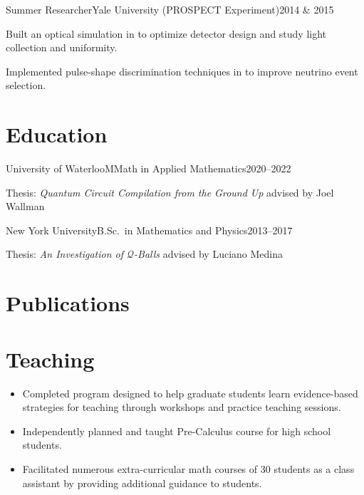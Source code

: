 \documentclass{cultvoucher}
\begin{document}
\begin{entry}{Summer Researcher}{Yale University (PROSPECT Experiment)}{2014 \& 2015}
    \item Built an optical simulation in  to optimize detector design and study light collection and uniformity.
    \item Implemented pulse-shape discrimination techniques in  to improve neutrino event selection.
\end{entry}

\section{Education}

\begin{entry}{University of Waterloo}{MMath in Applied Mathematics}{2020--2022}
	\item Thesis: \textit{Quantum Circuit Compilation from the Ground Up} advised by Joel Wallman
\end{entry}

\begin{entry}{New York University}{B.Sc.\ in Mathematics and Physics}{2013--2017}
	\item Thesis: \textit{An Investigation of $\mathcal{Q}$-Balls} advised by Luciano Medina
\end{entry}

\section{Publications} %

\section{Teaching}

\begin{itemize}
	\item Completed program designed to help graduate students learn evidence-based strategies for teaching through workshops and practice teaching sessions.
\end{itemize}

\begin{itemize}
	\item Independently planned and taught Pre-Calculus course for high school students.
	\item Facilitated numerous extra-curricular math courses of 30 students as a class assistant by providing additional guidance to students.
\end{itemize}
\end{document}
